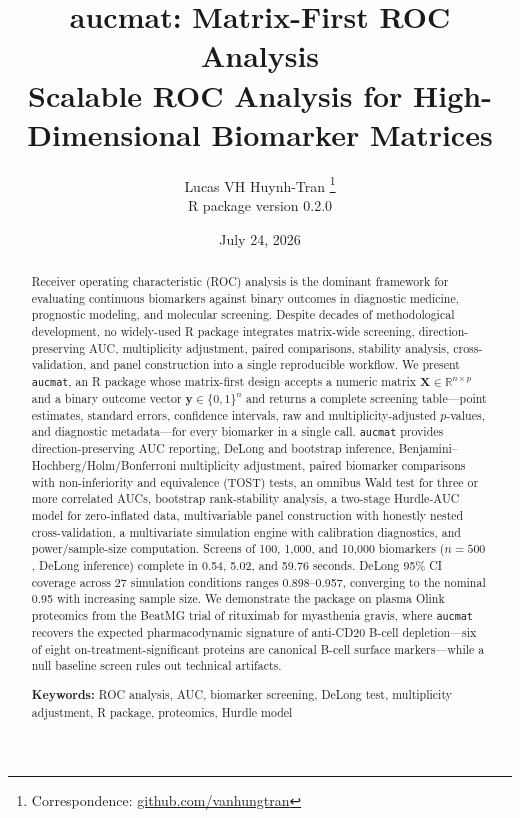 \documentclass[11pt,a4paper]{article}
\title{\textbf{aucmat: Matrix-First ROC Analysis\\[4pt]
        \large Scalable ROC Analysis for High-Dimensional Biomarker Matrices}}
\author{Lucas VH Huynh-Tran%
  \thanks{Correspondence: \href{https://github.com/vanhungtran}{github.com/vanhungtran}}%
  \\[4pt]
  \small R package version 0.2.0%
}
\date{July 24, 2026}
\begin{document}
\maketitle

\begin{abstract}
\noindent
Receiver operating characteristic (ROC) analysis is the dominant framework
for evaluating continuous biomarkers against binary outcomes in diagnostic
medicine, prognostic modeling, and molecular screening.  Despite decades of
methodological development, no widely-used R package integrates matrix-wide
screening, direction-preserving AUC, multiplicity adjustment, paired
comparisons, stability analysis, cross-validation, and panel construction
into a single reproducible workflow.  We present \texttt{aucmat}, an R
package whose matrix-first design accepts a numeric matrix $\mathbf{X} \in
\mathbb{R}^{n \times p}$ and a binary outcome vector $\mathbf{y} \in
\{0,1\}^n$ and returns a complete screening table---point estimates, standard
errors, confidence intervals, raw and multiplicity-adjusted $p$-values, and
diagnostic metadata---for every biomarker in a single call.  \texttt{aucmat}
provides direction-preserving AUC reporting, DeLong and bootstrap inference,
Benjamini--Hochberg/Holm/Bonferroni multiplicity adjustment, paired
biomarker comparisons with non-inferiority and equivalence (TOST) tests, an
omnibus Wald test for three or more correlated AUCs, bootstrap rank-stability
analysis, a two-stage Hurdle-AUC model for zero-inflated data, multivariable
panel construction with honestly nested cross-validation, a multivariate
simulation engine with calibration diagnostics, and power/sample-size
computation.  Screens of 100, 1{,}000, and 10{,}000 biomarkers ($n=500$,
DeLong inference) complete in 0.54, 5.02, and 59.76 seconds.  DeLong 95\%
CI coverage across 27 simulation conditions ranges 0.898--0.957, converging
to the nominal 0.95 with increasing sample size.  We demonstrate the package
on plasma Olink proteomics from the BeatMG trial of rituximab for myasthenia
gravis, where \texttt{aucmat} recovers the expected pharmacodynamic signature
of anti-CD20 B-cell depletion---six of eight on-treatment-significant
proteins are canonical B-cell surface markers---while a null baseline screen
rules out technical artifacts.

\smallskip
\noindent\textbf{Keywords:} ROC analysis, AUC, biomarker screening, DeLong
test, multiplicity adjustment, R package, proteomics, Hurdle model
\end{abstract}
\end{document}
